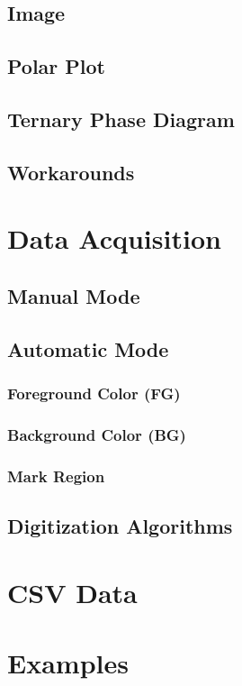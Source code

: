 \documentclass[letterpaper]{article}
\begin{document}
\subsection{Image}
\subsection{Polar Plot}
\subsection{Ternary Phase Diagram}
\subsection{Workarounds}


\section{Data Acquisition}
\subsection{Manual Mode}
\subsection{Automatic Mode}
\subsubsection{Foreground Color (FG)}
\subsubsection{Background Color (BG)}
\subsubsection{Mark Region}
\subsection{Digitization Algorithms}
\section{CSV Data}

\section{Examples}
\end{document}
